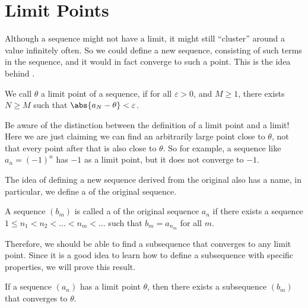 \section{Limit Points}

Although a sequence might not have a limit, it might still ``cluster'' around a value
infinitely often. So we could define a new sequence, consisting of such terms in
the sequence, and it would in fact converge to such a point.
This is the idea behind .

\begin{definition}
    We call $\theta$ a limit point of a sequence, if for all $\varepsilon > 0$, and
    $M \ge 1$, there exists $N \ge M$ such that $\abs{a_N - \theta} < \varepsilon$.
\end{definition}

Be aware of the distinction between the definition of a limit point and a limit! Here
we are just claiming we can find an arbitrarily large point close to $\theta$,
not that every point after that is also close to $\theta$. So for example, a sequence
like $a_n = (-1)^n$ has $-1$ as a limit point, but it does not converge to $-1$.

The idea of defining a new sequence derived from the original also has a name,
in particular, we define a  of the original sequence.

\begin{definition}
	A sequence $(b_m)$ is called a  of the original sequence $a_n$ if there
	exists a sequence $1 \le n_1 < n_2 < \dots < n_m < \dots$ such that $b_m = a_{n_m}$ for all $m$.
\end{definition}

Therefore, we should be able to find a subsequence that converges to any limit point. Since
it is a good idea to learn how to define a subsequence with specific properties,
we will prove this result.

\begin{theorem}
	If a sequence $(a_n)$ has a limit point $\theta$, then there exists a subsequence $(b_m)$
	that converges to $\theta$.
\end{theorem}

